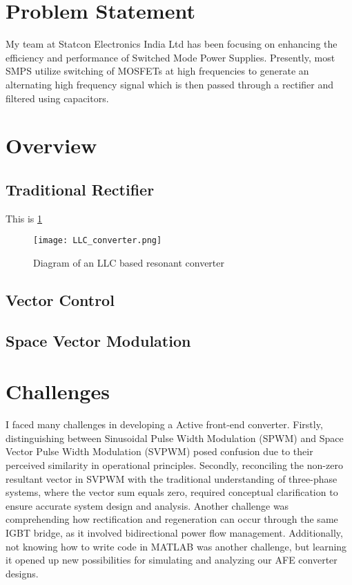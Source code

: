 
\section{Problem Statement}
My team at Statcon Electronics India Ltd has been focusing on enhancing the
efficiency and performance of Switched Mode Power Supplies. Presently, most
SMPS utilize switching of MOSFETs at high frequencies to generate an alternating
high frequency signal which is then passed through a rectifier and filtered using
capacitors.


\section{Overview}

\subsection{Traditional Rectifier}
This is \ref{fig:llc_converter}

\begin{figure}[h]
    \centering
    \texttt{[image: LLC\_converter.png]}
    \caption{Diagram of an LLC based resonant converter}
    \label{fig:llc_converter}
\end{figure}

\noindent


\subsection{Vector Control}


\subsection{Space Vector Modulation}


\section{Challenges}
I faced many challenges in developing a Active front-end converter. Firstly,
distinguishing between Sinusoidal Pulse Width Modulation (SPWM) and Space
Vector Pulse Width Modulation (SVPWM) posed confusion due to their perceived
similarity in operational principles. Secondly, reconciling the non-zero
resultant vector in SVPWM with the traditional understanding of three-phase
systems, where the vector sum equals zero, required conceptual clarification to
ensure accurate system design and analysis. Another challenge was comprehending
how rectification and regeneration can occur through the same IGBT bridge, as
it involved bidirectional power flow management. Additionally, not knowing how
to write code in MATLAB was another challenge, but learning it opened up new
possibilities for simulating and analyzing our AFE converter designs.
